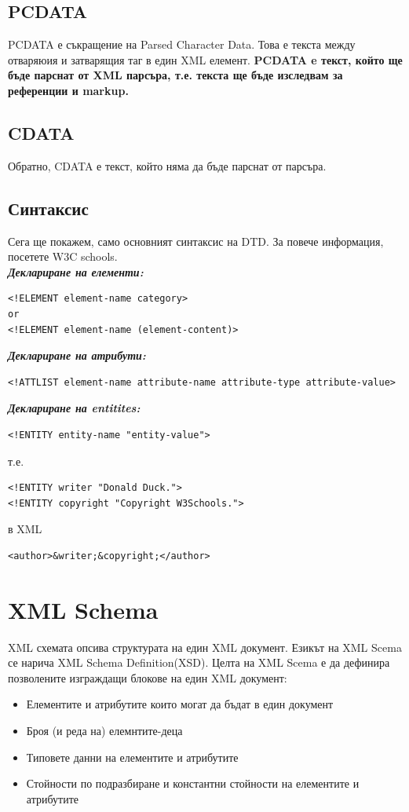 \documentclass[11pt]{article} %
\begin{document}
\subsection{PCDATA}
PCDATA е съкращение на Parsed Character Data. Това е текста между отваряюия и затварящия таг в един XML елемент. \textbf{PCDATA e текст, който ще бъде парснат от XML парсъра, т.е. текста ще бъде изследвам за референции и markup.}

\subsection{CDATA}
Обратно, CDATA е текст, който няма да бъде парснат от парсъра.

\subsection{Синтаксис}
Сега ще покажем, само основният синтаксис на DTD. За повече информация, посетете W3C schools.\\
\textit{\textbf{Деклариране на елементи:}}\\
\begin{verbatim}
<!ELEMENT element-name category>
or
<!ELEMENT element-name (element-content)>
\end{verbatim}

\textit{\textbf{Деклариране на атрибути:}}\\
\begin{verbatim}
<!ATTLIST element-name attribute-name attribute-type attribute-value>
\end{verbatim}

\textit{\textbf{Деклариране на entitites:}}\\
\begin{verbatim}
<!ENTITY entity-name "entity-value">
\end{verbatim}
т.е.
\begin{verbatim}
<!ENTITY writer "Donald Duck.">
<!ENTITY copyright "Copyright W3Schools.">
\end{verbatim}
в XML
\begin{verbatim}
<author>&writer;&copyright;</author>
\end{verbatim}

\section{XML Schema}
XML схемата опсива структурата на един XML документ. Езикът на XML Scema се нарича XML Schema Definition(XSD). Целта на XML Scema е да дефинира позволените изграждащи блокове на един XML документ:
\begin{itemize}[noitemsep]
	\item Елементите и атрибутите които могат да бъдат в един документ
	\item Броя (и реда на) елемнтите-деца
	\item Типовете данни на елементите и атрибутите
	\item Стойности по подразбиране и константни стойности на елементите и атрибутите
\end{itemize}
\end{document}
